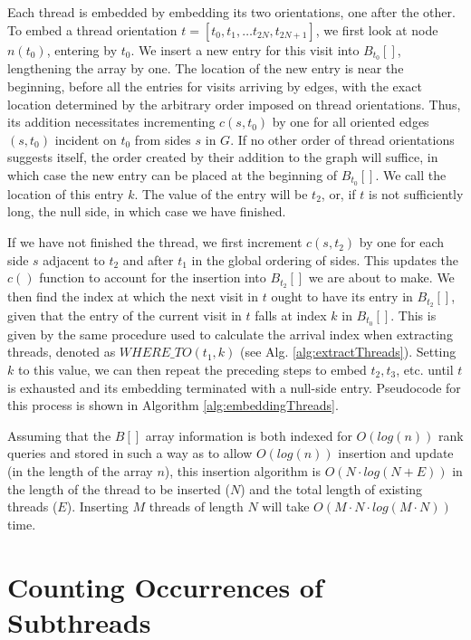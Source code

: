 Each thread is embedded by embedding its two orientations, one after the other. To embed a thread orientation $t = [t_0, t_1, \ldots t_{2N}, t_{2N+1}]$, we first look at node $n(t_0)$, entering by $t_0$. We insert a new entry for this visit into $B_{t_0}[]$, lengthening the array by one. The location of the new entry is near the beginning, before all the entries for visits arriving by edges, with the exact location determined by the arbitrary order imposed on thread orientations. Thus, its addition necessitates incrementing $c(s, t_0)$ by one for all oriented edges $(s, t_0)$ incident on $t_0$ from sides $s$ in $G$. If no other order of thread orientations suggests itself, the order created by their addition to the graph will suffice, in which case the new entry can be placed at the beginning of $B_{t_0}[]$. We call the location of this entry $k$. The value of the entry will be $t_2$, or, if $t$ is not sufficiently long, the null side, in which case we have finished. 

If we have not finished the thread, we first increment $c(s, t_2)$ by one for each side $s$ adjacent to $t_2$ and after $t_1$ in the global ordering of sides. This updates the $c()$ function to account for the insertion into $B_{t_2}[]$ we are about to make.
We then find the index at which the next visit in $t$ ought to have its entry in $B_{t_{2}}[]$, given that the entry of the current visit in $t$ falls at index $k$ in $B_{t_{0}}[]$. This is given by the same procedure used to calculate the arrival index when extracting threads, denoted as $WHERE\_TO(t_1, k)$ (see Alg. \ref{alg:extractThreads}). Setting $k$ to this value, we can then repeat the preceding steps to embed $t_2, t_3$, etc. until $t$ is exhausted and its embedding terminated with a null-side entry. Pseudocode for this process is shown in Algorithm \ref{alg:embeddingThreads}.

Assuming that the $B[]$ array information is both indexed for $O(log(n))$ rank queries and stored in such a way as to allow $O(log(n))$ insertion and update (in the length of the array $n$), this insertion algorithm is $O(N \cdot log (N + E))$ in the length of the thread to be inserted ($N$) and the total length of existing threads ($E$). Inserting $M$ threads of length $N$ will take $O(M \cdot N \cdot log(M \cdot N))$ time. 

\section{Counting Occurrences of Subthreads}

